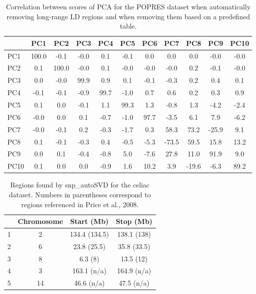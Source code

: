 \documentclass[a4paper, 11pt]{article}
\begin{document}
\begin{table}[!h]
\centering
\begin{tabular}{l|cccccccccc}
  \hline
 & PC1 & PC2 & PC3 & PC4 & PC5 & PC6 & PC7 & PC8 & PC9 & PC10 \\
  \hline
PC1 & 100.0 & -0.1 & -0.0 & 0.1 & -0.1 & 0.0 & 0.0 & 0.0 & -0.0 & -0.0 \\
  PC2 & 0.1 & 100.0 & -0.0 & 0.1 & -0.0 & -0.0 & -0.0 & 0.2 & -0.1 & -0.0 \\
  PC3 & 0.0 & -0.0 & 99.9 & 0.9 & 0.1 & -0.1 & -0.3 & 0.2 & 0.4 & 0.1 \\
  PC4 & -0.1 & -0.1 & -0.9 & 99.7 & -1.0 & 0.7 & 0.6 & 0.2 & 0.3 & 0.9 \\
  PC5 & 0.1 & 0.0 & -0.1 & 1.1 & 99.3 & 1.3 & -0.8 & 1.3 & -4.2 & -2.4 \\
  PC6 & -0.0 & 0.0 & 0.1 & -0.7 & -1.0 & 97.7 & -3.5 & 6.1 & 7.9 & -6.2 \\
  PC7 & -0.0 & -0.1 & 0.2 & -0.3 & -1.7 & 0.3 & 58.3 & 73.2 & -25.9 & 9.1 \\
  PC8 & 0.1 & -0.1 & -0.3 & 0.4 & -0.5 & -5.3 & -73.5 & 59.5 & 15.8 & 13.2 \\
  PC9 & 0.0 & 0.1 & -0.4 & -0.8 & 5.0 & -7.6 & 27.8 & 11.0 & 91.9 & 9.0 \\
  PC10 & 0.1 & 0.0 & 0.0 & -0.9 & 1.6 & 10.2 & 3.9 & -19.6 & -6.3 & 89.2 \\
   \hline
\end{tabular}
\caption{Correlation between scores of PCA for the POPRES dataset  when automatically removing long-range LD regions and when removing them based on a predefined table.}
\label{tab:pc-popres}
\end{table}

\clearpage

\begin{table}[!h]
\centering
\begin{tabular}{lccc}
  \hline
 & Chromosome & Start (Mb) & Stop (Mb) \\ 
  \hline
1 &  2 & 134.4 (134.5) & 138.1 (138) \\ 
  2 &  6 & 23.8 (25.5) & 35.8 (33.5) \\ 
  3 &  8 & 6.3 (8) & 13.5 (12) \\ 
  4 &  3 & 163.1 (n/a) & 164.9 (n/a) \\ 
  5 & 14 & 46.6 (n/a) & 47.5 (n/a) \\ 
   \hline
\end{tabular}
\caption{Regions found by snp\_autoSVD for the celiac dataset. Numbers in parentheses correspond to regions referenced in Price et al., 2008.}
\label{tab:lrldr-celiac}
\end{table}
\end{document}
